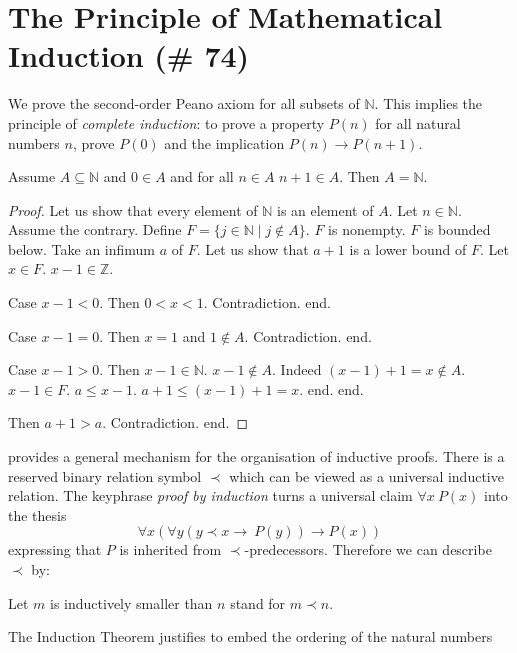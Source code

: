 \documentclass{article}
\begin{document}
\section{The Principle of Mathematical Induction (\# 74)}

We prove the second-order Peano axiom for all subsets of $\mathbb{N}$.
This implies the principle of {\em complete induction}: to prove a 
property $P(n)$ for all natural numbers $n$, prove $P(0)$ and
the implication $P(n) \rightarrow P(n+1)$. 
%
\begin{forthel}

\begin{theorem}
Assume $A \subseteq \mathbb{N}$
and $0 \in A$ and for all $n \in A$ $n + 1 \in A$.
Then $A = \mathbb{N}$.
\end{theorem}

\begin{proof}
Let us show that every element of $\mathbb{N}$ is an element of $A$.
	Let $n \in \mathbb{N}$.
	Assume the contrary.
	Define $F = \{  j \in \mathbb{N} \mid j \notin A\}$.
	$F$ is nonempty. $F$ is bounded below.
  Take an infimum $a$ of $F$.
	Let us show that $a+1$ is a lower bound of $F$.
		Let $x \in F$. $x - 1 \in \mathbb{Z}$.

		Case $x - 1 < 0$. Then $0 < x < 1$. Contradiction. end.

		Case $x - 1 = 0$. Then $x = 1$ and $1 \notin A$. Contradiction. end.

		Case $x - 1 > 0$. Then $x - 1 \in \mathbb{N}$.
      $x - 1 \notin A$. Indeed $(x - 1) + 1 = x \notin A$. $x - 1 \in F$.
			$a \leq x - 1$.
			$a + 1 \leq (x - 1) + 1 = x$.
		end.
	end.

	Then $a+1 > a$.
	Contradiction.
end.
\end{proof}
\end{forthel}
%
\Naproche provides a general mechanism for the organisation of
inductive proofs. There is a reserved binary relation
symbol $\prec$ which can be viewed as a universal inductive relation.
The keyphrase {\em proof by induction} turns a universal
claim $\forall x \ P(x)$ into the thesis
$$\forall x (\forall y (y \prec x \rightarrow \ P(y)) \rightarrow P(x))$$
expressing that $P$ is inherited from $\prec$-predecessors.  
Therefore we can describe $\prec$ by:
%
\begin{forthel}
Let $m$ is inductively smaller than $n$ stand for $m \prec n$.
\end{forthel}
%
The Induction Theorem justifies to embed the ordering of the natural numbers
\end{document}
